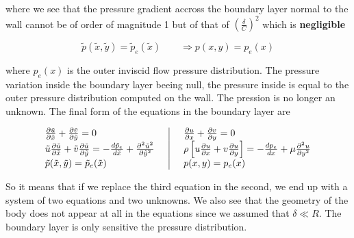 	where we see that the pressure gradient accross the boundary layer normal to the wall cannot be of order of magnitude 1 but of that of $\left(\frac{\delta}{C}\right) ^2$ which is \textbf{negligible}

	\begin{equation}
		\tilde{p}(\tilde{x}, \tilde{y}) = \tilde{p}_e (\tilde{x}) \qquad \Rightarrow p(x,y) = p_e(x) 
	\end{equation}

	where $p_e(x)$ is the outer inviscid flow pressure distribution. The pressure variation inside the boundary layer beeing null, the pressure inside is equal to the outer pressure distribution computed on the wall. The pression is no longer an unknown. The final form of the equations in the boundary layer are 

	\begin{equation}
	\begin{array}{l|l}
		\frac{\D \tilde{u}}{\D \tilde{x}} + \frac{\D \tilde{v}}{\D \tilde{y}} = 0	 & 	\quad\frac{\D u}{\D x} + \frac{\D v}{\D y} = 0\\
	 		\tilde{u} \frac{\D \tilde{u}}{\D \tilde{x}} +  \tilde{v} \frac{\D \tilde{u}}{\D \tilde{y}} = -\frac{d \tilde{p}_e}{d \tilde{x}}	+ \frac{\D ^2 \tilde{u}^2}{\D \tilde{y}^2}\quad & 	\quad	 \rho \left[ u \frac{\D u}{\D x} + v \frac{\D u}{\D y} \right] = -\frac{d p_e}{d x} + \mu \frac{\D ^2 u}{\D y^2}\\
	 		\tilde{p}(\tilde{x}, \tilde{y}) = \tilde{p}_e (\tilde{x}) 	&\quad p(x,y) = p_e(x) 
	\end{array}
	\end{equation}
	
	So it means that if we replace the third equation in the second, we end up with a system of two equations and two unknowns. We also see that the geometry of the body does not appear at all in the equations since we assumed that $\delta \ll R$. The boundary layer is only sensitive the pressure distribution.
	

